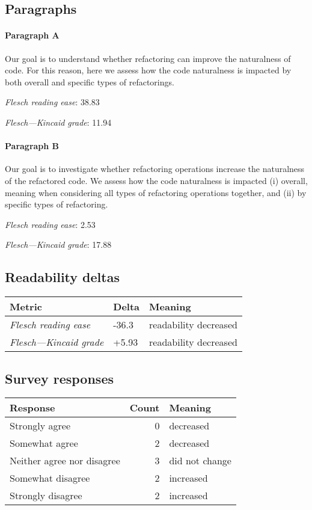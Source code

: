 \subsection{Paragraphs}
\paragraph{Paragraph A}
Our goal is to understand whether refactoring can improve the naturalness of code. For this reason, here we assess how the code naturalness is impacted by both overall and specific types of refactorings.\par\medskip
\emph{Flesch reading ease}: 38.83\par
\emph{Flesch---Kincaid grade}: 11.94

\paragraph{Paragraph B}
Our goal is to investigate whether refactoring operations increase the naturalness of the refactored code. We assess how the code naturalness is impacted (i) overall, meaning when considering all types of refactoring operations together, and (ii) by specific types of refactoring.\par\medskip
\emph{Flesch reading ease}: 2.53\par
\emph{Flesch---Kincaid grade}: 17.88

\subsection{Readability deltas}

\begin{tabular}{lll}
\toprule
               \textbf{Metric} & \textbf{Delta} &       \textbf{Meaning} \\
\midrule
    \emph{Flesch reading ease} &          -36.3 &  readability decreased \\
 \emph{Flesch---Kincaid grade} &          +5.93 &  readability decreased \\
\bottomrule
\end{tabular}

\subsection{Survey responses}
\begin{tabular}{lrl}
\toprule
          \textbf{Response} &  \textbf{Count} & \textbf{Meaning} \\
\midrule
             Strongly agree &               0 &        decreased \\
             Somewhat agree &               2 &        decreased \\
 Neither agree nor disagree &               3 &   did not change \\
          Somewhat disagree &               2 &        increased \\
          Strongly disagree &               2 &        increased \\
\bottomrule
\end{tabular}

